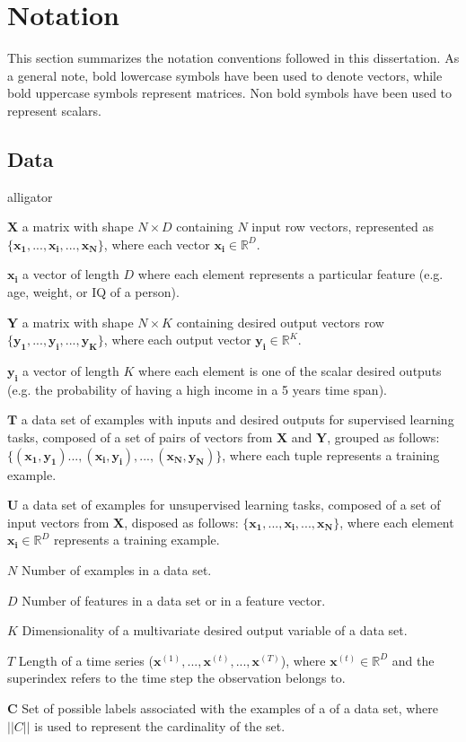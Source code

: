 \chapter*{Notation} \label{ch:notation}
This section summarizes the notation conventions followed in this dissertation. As a general note, bold lowercase symbols have been used to denote vectors, while bold uppercase symbols represent matrices. Non bold symbols have been used to represent scalars. 

\section*{Data}

\begin{labeling}{alligator}
	\item [$\mathbf{X}$] a matrix with shape $N \times D$ containing $N$ input row vectors, represented as $\{\mathbf{x_1},...,\mathbf{x_i},...,\mathbf{x_N}\}$, where each vector $\mathbf{x_i} \in \mathbb{R}^D$.
	\item [$\mathbf{x_i}$] a vector of length $D$ where each element represents a particular feature (e.g. age, weight, or IQ of a person).
	\item [$\mathbf{Y}$] a matrix with shape $N \times K$ containing desired output vectors row $\{\mathbf{y_1},...,\mathbf{y_i},...,\mathbf{y_K}\}$, where each output vector $\mathbf{y_i} \in \mathbb{R}^K$.
	\item [$\mathbf{y_i}$]  a vector of length $K$ where each element is one of the scalar desired outputs (e.g. the probability of having a high income in a 5 years time span).
	\item [$\mathbf{T}$] a data set  of examples with inputs and desired outputs for supervised learning tasks, composed of a set of pairs of vectors from $\mathbf{X}$ and $\mathbf{Y}$, grouped as follows: $\{(\mathbf{x_1}, \mathbf{y_1})...,(\mathbf{x_i}, \mathbf{y_i}),...,(\mathbf{x_N}, \mathbf{y_N})\}$, where each tuple represents a training example.
	\item [$\mathbf{U}$] a data set of examples for unsupervised learning tasks, composed of a set of input vectors from $\mathbf{X}$, disposed as follows: $\{\mathbf{x_1},...,\mathbf{x_i},...,\mathbf{x_N}\}$, where each element $\mathbf{x_i} \in \mathbb{R}^D$ represents a training example.
	\item [$N$] Number of examples in a data set.
	\item [$D$]  Number of features in a data set or in a feature vector.
	\item [$K$] Dimensionality of a multivariate desired output variable of a data set.
	\item [$T$] Length of a time series ($\mathbf{x}^{(1)}, ..., \mathbf{x}^{(t)}, ..., \mathbf{x}^{(T)}$), where $\mathbf{x}^{(t)} \in \mathbb{R}^D$ and the superindex refers to the time step the observation belongs to.
	\item [$\mathbf{C}$] Set of possible labels associated with the examples of a of a data set, where $||C||$ is used to represent the cardinality of the set.
\end{labeling}

